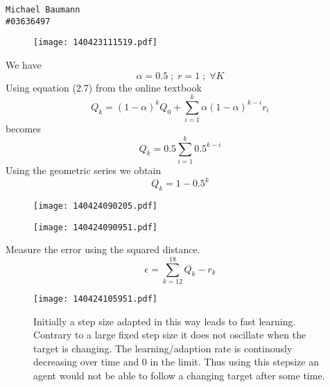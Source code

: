 

\begin{verbatim}
Michael Baumann
#03636497
\end{verbatim}

\begin{figure}[ht]
\texttt{[image: 140423111519.pdf]}
\caption{}
\end{figure}

We have
$$\alpha = 0.5 \;;\; r = 1 \;;\; \forall K$$
Using equation (2.7) from the online textbook
$$Q_k = (1 - \alpha)^k Q_0 + \sum\limits_{i=1}^k \alpha (1-\alpha)^{k-i} r_i$$
becomes
$$Q_k = 0.5  \sum\limits_{i=1}^k 0.5^{k-i}$$
Using the geometric series we obtain
$$Q_k = 1 - 0.5^k$$

\begin{figure}[ht]
\texttt{[image: 140424090205.pdf]}
\caption{}
\end{figure}

\begin{figure}[ht]
\texttt{[image: 140424090951.pdf]}
\caption{}
\end{figure}

Measure the error using the squared distance.
$$\epsilon = \sum\limits_{k=12}^{18} Q_k - r_k$$

\begin{figure}[ht]
\texttt{[image: 140424105951.pdf]}
\caption{
Initially a step size adapted in this way leads to fast learning.
Contrary to a large fixed step size it does not oscillate when the target is changing.
The learning/adaption rate is continously decreasing over time and 0 in the limit.
Thus using  this stepsize an agent would not be able to follow a changing target after some time.
}
\end{figure}

